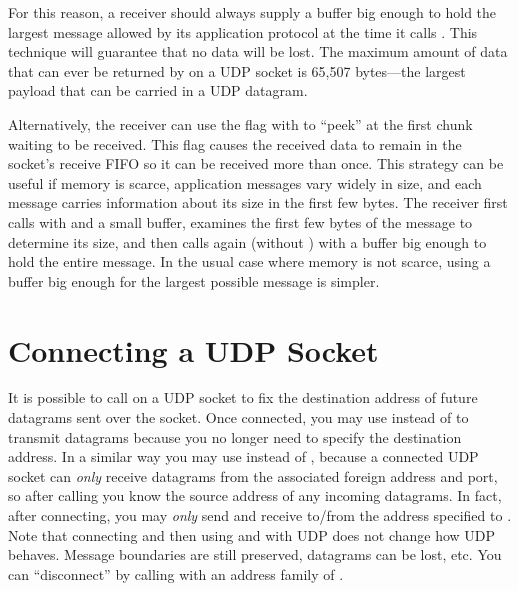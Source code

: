 For this reason, a receiver should always supply a buffer big enough
to hold the largest message allowed by its application protocol at the
time it calls
. This technique will guarantee that no data will be
lost.  The maximum amount of data that can ever be returned by
 on a UDP socket is 65,507 bytes---the
largest payload that can be carried in a UDP datagram.

Alternatively, the receiver can use the 
flag with  to
``peek'' at the first chunk waiting to be received.
This flag causes the received data to remain in the
socket's receive FIFO so it can be received more than once.
This strategy can be
useful if memory is scarce, application messages vary widely in
size, and each message carries information about its size in the first
few bytes.  The receiver first calls  with
 and a small buffer, examines the first
few bytes of the message to determine its size, and then calls
 again (without )
with a buffer big enough to hold the entire message.  In the
usual case where memory is not scarce, using a buffer big enough for
the largest possible message is simpler.


\section{Connecting a UDP Socket}
\label{sect:udpconnect}
It is possible to
call  on a UDP socket to fix the
destination address of future datagrams sent over the socket.
Once connected, you may use
 instead of  to transmit datagrams
because you no longer need to specify the destination address.
%
In a similar way you may use  instead of
, because a connected UDP socket can \emph{only\/}
receive datagrams from the associated foreign address and port, so
after calling  you
know the source address of any incoming datagrams.
In fact, after
connecting, you may \emph{only} send and receive to/from the address
specified to .  Note that connecting and then using  and
 with UDP does not change how UDP behaves.  Message 
boundaries are still preserved, datagrams can be lost, etc.  You can ``disconnect'' by calling
 with an address family of .

